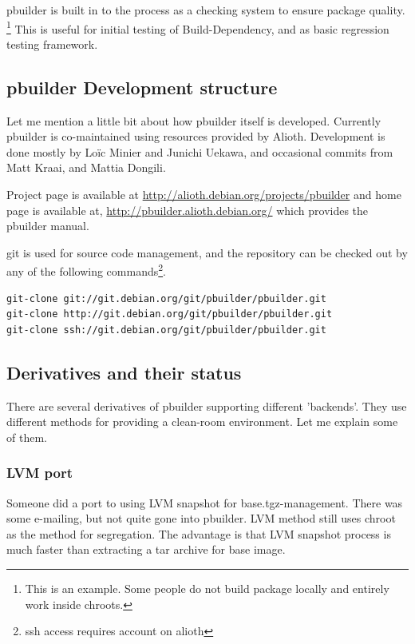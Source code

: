 \documentclass[a4paper]{article}
\begin{document}
pbuilder is built in to the process as a checking system to ensure
package quality.  \footnote{This is an example. Some people do not build
package locally and entirely work inside chroots.}  This is useful for
initial testing of Build-Dependency, and as basic regression testing
framework.

\subsection{pbuilder Development structure}

Let me mention a little bit about how pbuilder itself is developed.
Currently pbuilder is co-maintained using resources provided by Alioth.
Development is done mostly by Lo\"ic Minier and Junichi Uekawa, and
occasional commits from Matt Kraai, and Mattia Dongili.

Project page is available at 
\url{http://alioth.debian.org/projects/pbuilder}
and home page is available at, 
\url{http://pbuilder.alioth.debian.org/}
which provides the pbuilder manual.

git is used for source code management, and the repository can be
checked out by any of the following commands\footnote{ssh access
requires account on alioth}.

\begin{verbatim}
git-clone git://git.debian.org/git/pbuilder/pbuilder.git
git-clone http://git.debian.org/git/pbuilder/pbuilder.git
git-clone ssh://git.debian.org/git/pbuilder/pbuilder.git
\end{verbatim}

\subsection{Derivatives and their status}

There are several derivatives of pbuilder supporting different
'backends'. They use different methods for providing a clean-room
environment.
Let me explain some of them.

\subsubsection{LVM port}

Someone did a port to using LVM snapshot for base.tgz-management.  There
was some e-mailing, but not quite gone into pbuilder.  LVM method still
uses chroot as the method for segregation. The advantage is that LVM
snapshot process is much faster than extracting a tar archive for base
image.
\end{document}
